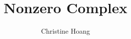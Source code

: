 \documentclass{article}
\title{Nonzero Complex}
\author{Christine Hoang}
\begin{document}
\maketitle

\section{}
\end{document}
